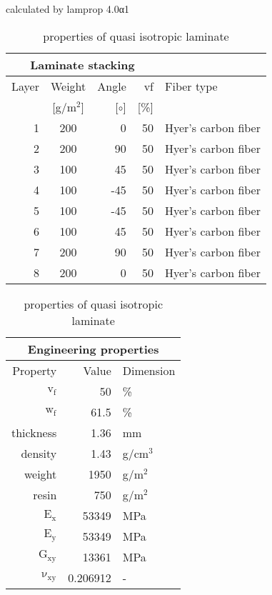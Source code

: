 \begin{table}[!htbp]
  \renewcommand{\arraystretch}{1.2}
  \caption{\label{tab:quasi isotropic laminate}properties of quasi isotropic laminate}
  \centering\footnotesize{\rule{0pt}{10pt}
  \tiny calculated by lamprop 4.0α1\\[3pt]}
    \begin{tabular}[t]{rcrrl}
      \multicolumn{4}{c}{\small\textbf{Laminate stacking}}\\[0.1em]
      \toprule %
      Layer & Weight & Angle & vf & Fiber type\\
            & [g/m$^2$] & [$\circ$] & [\%]\\
      \midrule
      1 &  200 &     0 & 50 & Hyer's carbon fiber\\
      2 &  200 &    90 & 50 & Hyer's carbon fiber\\
      3 &  100 &    45 & 50 & Hyer's carbon fiber\\
      4 &  100 &   -45 & 50 & Hyer's carbon fiber\\
      5 &  100 &   -45 & 50 & Hyer's carbon fiber\\
      6 &  100 &    45 & 50 & Hyer's carbon fiber\\
      7 &  200 &    90 & 50 & Hyer's carbon fiber\\
      8 &  200 &     0 & 50 & Hyer's carbon fiber\\
      \bottomrule
    \end{tabular}\hspace{0.02\textwidth}
    \begin{tabular}[t]{rrl}
      \multicolumn{3}{c}{\small\textbf{Engineering properties}}\\[0.1em]
      \toprule
      Property & Value & Dimension\\
      \midrule
      $\mathrm{v_f}$ & 50 &\%\\
      $\mathrm{w_f}$ & 61.5 &\%\\
      thickness & 1.36 & mm\\
      density & 1.43 & g/cm$^3$\\
      weight & 1950 & g/m$^2$\\
      resin & 750 & g/m$^2$\\
      \midrule
      $\mathrm{E_x}$ &    53349 & MPa\\
      $\mathrm{E_y}$ &    53349 & MPa\\
      $\mathrm{G_{xy}}$ &    13361 & MPa\\
      $\mathrm{\nu_{xy}}$ & 0.206912 &-\\

\end{tabular}
\end{table}
